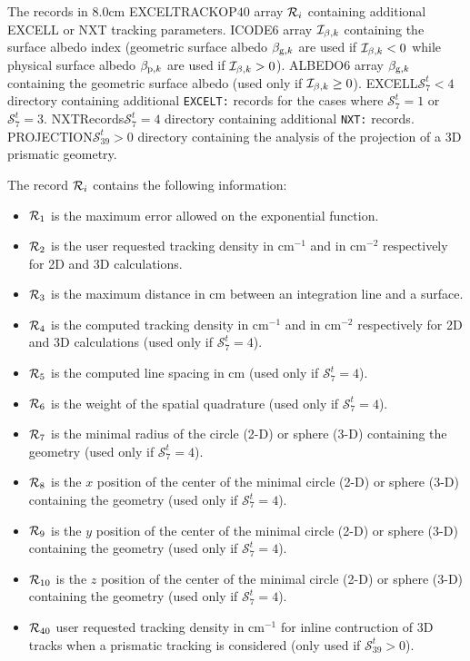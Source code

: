 \begin{DescriptionEnregistrement}{The  records in }{8.0cm}
\RealEnr
  {EXCELTRACKOP}{$40$}{}
  {array ${\cal R}_i$ containing additional EXCELL or NXT tracking parameters.} 
\IntEnr
  {ICODE}{$6$}
  {array ${\cal I}_{\beta,k}$ containing the surface albedo index (geometric surface albedo
  $\beta_{{\rm g},k}$ are used if ${\cal I}_{\beta,k}< 0$ while physical 
  surface albedo $\beta_{{\rm p},k}$ are used if ${\cal I}_{\beta,k}> 0$).} 
\RealEnr
  {ALBEDO}{$6$}{}
  {array $\beta_{{\rm g},k}$ containing the geometric surface albedo (used only if ${\cal I}_{\beta,k}\ge 0$).}
\OptDirEnr
  {EXCELL}{$\mathcal{S}^{t}_{7}< 4$}
  {directory containing additional {\tt EXCELT:}  records for the cases where $\mathcal{S}^{t}_{7}=1$ or $\mathcal{S}^{t}_{7}=3$.}
\OptDirEnr
  {NXTRecords}{$\mathcal{S}^{t}_{7}=4$}
  {directory containing additional {\tt NXT:} records.}
\OptDirEnr
  {PROJECTION}{$\mathcal{S}^{t}_{39}>0$}
  {directory containing the analysis of the projection of a 3D prismatic geometry.}
\end{DescriptionEnregistrement}

The record ${\cal R}_i$ contains the following information:
\begin{itemize}
\item ${\cal R}_1$ is the maximum error allowed on the exponential function. 
\item ${\cal R}_2$ is the user requested tracking density in cm$^{-1}$ and in cm$^{-2}$ respectively for 2D and 3D calculations. 
\item ${\cal R}_3$ is the maximum distance in cm between an integration line and a surface. 
\item ${\cal R}_4$ is the computed tracking density in cm$^{-1}$ and in cm$^{-2}$ respectively for 2D and 3D calculations (used 
only if $\mathcal{S}^{t}_{7}=4$).
\item ${\cal R}_5$ is the computed line spacing in cm (used only if $\mathcal{S}^{t}_{7}=4$). 
\item ${\cal R}_6$ is the weight of the spatial quadrature (used only if $\mathcal{S}^{t}_{7}=4$). 
\item ${\cal R}_7$ is the minimal radius of the circle (2-D) or sphere (3-D) containing the geometry (used only if $\mathcal{S}^{t}_{7}=4$). 
\item ${\cal R}_8$ is the $x$ position of the center of the minimal circle (2-D) or sphere (3-D) containing the geometry (used 
only if $\mathcal{S}^{t}_{7}=4$). 
\item ${\cal R}_9$ is the $y$ position of the center of the minimal circle (2-D) or sphere (3-D) containing the geometry (used 
only if $\mathcal{S}^{t}_{7}=4$). 
\item ${\cal R}_{10}$ is the $z$ position of the center of the minimal circle (2-D) or sphere (3-D) containing the geometry (used 
only if $\mathcal{S}^{t}_{7}=4$). 
\item ${\cal R}_{40}$ user requested tracking density in cm$^{-1}$ for inline contruction of 3D tracks when a prismatic tracking is considered (only used if $\mathcal{S}^{t}_{39}>0$).
\end{itemize}

